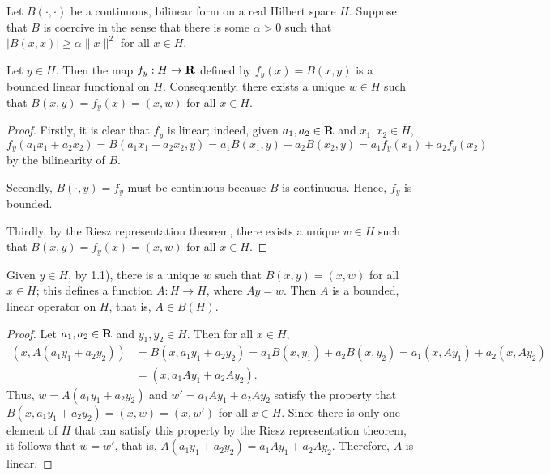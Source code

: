 \documentclass{homework}
\begin{document}
	\maketitle
	
	\question
	Let $B(\cdot,\cdot)$ be a continuous, bilinear form on a real Hilbert space $H$. Suppose that $B$ is coercive in the sense that there is some $\alpha > 0$ such that $|B(x,x)| \ge \alpha\lVert x\rVert^2$ for all $x \in H$.
	\begin{arabicparts}
		\questionpart 
		Let $y \in H$. Then the map $f_y : H \to \textbf{R}$ defined by $f_y(x) = B(x,y)$ is a bounded linear functional on $H$. Consequently, there exists a unique $w \in H$ such that $B(x,y) = f_y(x) = (x,w)$ for all $x \in H$.
		\begin{proof}
			Firstly, it is clear that $f_y$ is linear; indeed, given $a_1, a_2 \in \textbf{R}$ and $x_1, x_2 \in H$,
			\begin{equation}
				f_y(a_1x_1+a_2x_2) = B(a_1x_1+a_2x_2,y) = a_1B(x_1,y) + a_2B(x_2,y) = a_1f_y(x_1) + a_2f_y(x_2)
			\end{equation}
			by the bilinearity of $B$.
			
			Secondly, $B(\cdot, y)=f_y$ must be continuous because $B$ is continuous. Hence, $f_y$ is bounded.
			
			Thirdly, by the Riesz representation theorem, there exists a unique $w \in H$ such that $B(x,y) = f_y(x) = (x,w)$ for all $x \in H$.
		\end{proof}
		
		\questionpart 
		Given $y \in H$, by 1.1), there is a unique $w$ such that $B(x,y) = (x,w)$ for all $x \in H$; this defines a function $A: H \to H$, where $Ay = w$. Then $A$ is a bounded, linear operator on $H$, that is, $A \in B(H)$.
		\begin{proof}
			Let $a_1, a_2 \in \textbf{R}$ and $y_1, y_2 \in H$. Then for all $x \in H$,
			\begin{equation}
			\begin{aligned}
				(x, A(a_1y_1+a_2y_2)) &= B(x,a_1y_1 + a_2y_2) = a_1B(x,y_1) + a_2B(x,y_2) = a_1(x,Ay_1) + a_2(x,Ay_2) \\
				&= (x, a_1Ay_1 + a_2Ay_2).
			\end{aligned}
			\end{equation}
			Thus, $w=A(a_1y_1+a_2y_2)$ and $w' = a_1Ay_1 + a_2Ay_2$ satisfy the property that $B(x,a_1y_1+a_2y_2) = (x,w) = (x,w')$ for all $x \in H$. Since there is only one element of $H$ that can satisfy this property by the Riesz representation theorem, it follows that $w=w'$, that is, $A(a_1y_1 + a_2y_2) = a_1Ay_1 + a_2Ay_2$. Therefore, $A$ is linear.
			

\end{proof}
\end{arabicparts}
\end{document}
